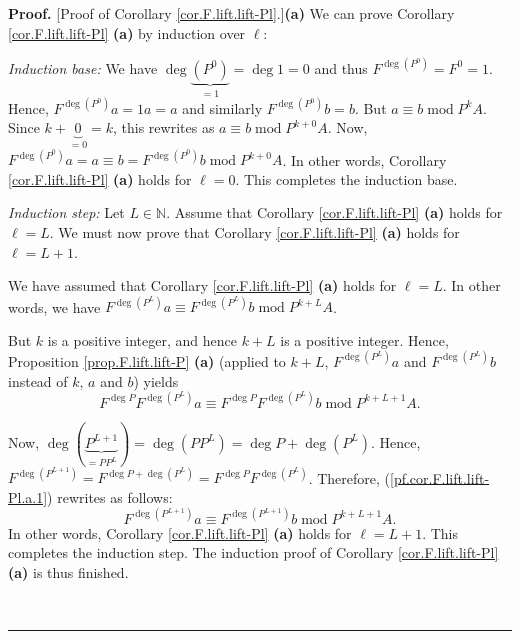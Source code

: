 \documentclass[numbers=enddot,12pt,final,onecolumn,notitlepage]{scrartcl}%
\theoremstyle{definition}
\newenvironment{proof}[1][Proof]{\noindent\textbf{#1.} }{\ \rule{0.5em}{0.5em}}
\begin{document}
\begin{proof}
[Proof of Corollary \ref{cor.F.lift.lift-Pl}.]\textbf{(a)} We can prove
Corollary \ref{cor.F.lift.lift-Pl} \textbf{(a)} by induction over $\ell$:

\textit{Induction base:} We have $\deg\underbrace{\left(  P^{0}\right)  }%
_{=1}=\deg1=0$ and thus $F^{\deg\left(  P^{0}\right)  }=F^{0}=1$. Hence,
$F^{\deg\left(  P^{0}\right)  }a=1a=a$ and similarly $F^{\deg\left(
P^{0}\right)  }b=b$. But $a\equiv b\operatorname{mod}P^{k}A$. Since
$k+\underbrace{0}_{=0}=k$, this rewrites as $a\equiv b\operatorname{mod}%
P^{k+0}A$. Now, $F^{\deg\left(  P^{0}\right)  }a=a\equiv b=F^{\deg\left(
P^{0}\right)  }b\operatorname{mod}P^{k+0}A$. In other words, Corollary
\ref{cor.F.lift.lift-Pl} \textbf{(a)} holds for $\ell=0$. This completes the
induction base.

\textit{Induction step:} Let $L\in\mathbb{N}$. Assume that Corollary
\ref{cor.F.lift.lift-Pl} \textbf{(a)} holds for $\ell=L$. We must now prove
that Corollary \ref{cor.F.lift.lift-Pl} \textbf{(a)} holds for $\ell=L+1$.

We have assumed that Corollary \ref{cor.F.lift.lift-Pl} \textbf{(a)} holds for
$\ell=L$. In other words, we have $F^{\deg\left(  P^{L}\right)  }a\equiv
F^{\deg\left(  P^{L}\right)  }b\operatorname{mod}P^{k+L}A$.

But $k$ is a positive integer, and hence $k+L$ is a positive integer. Hence,
Proposition \ref{prop.F.lift.lift-P} \textbf{(a)} (applied to $k+L$,
$F^{\deg\left(  P^{L}\right)  }a$ and $F^{\deg\left(  P^{L}\right)  }b$
instead of $k$, $a$ and $b$) yields
\begin{equation}
F^{\deg P}F^{\deg\left(  P^{L}\right)  }a\equiv F^{\deg P}F^{\deg\left(
P^{L}\right)  }b\operatorname{mod}P^{k+L+1}A.
\label{pf.cor.F.lift.lift-Pl.a.1}%
\end{equation}


Now, $\deg\left(  \underbrace{P^{L+1}}_{=PP^{L}}\right)  =\deg\left(
PP^{L}\right)  =\deg P+\deg\left(  P^{L}\right)  $. Hence, $F^{\deg\left(
P^{L+1}\right)  }=F^{\deg P+\deg\left(  P^{L}\right)  }=F^{\deg P}%
F^{\deg\left(  P^{L}\right)  }$. Therefore, (\ref{pf.cor.F.lift.lift-Pl.a.1})
rewrites as follows:%
\[
F^{\deg\left(  P^{L+1}\right)  }a\equiv F^{\deg\left(  P^{L+1}\right)
}b\operatorname{mod}P^{k+L+1}A.
\]
In other words, Corollary \ref{cor.F.lift.lift-Pl} \textbf{(a)} holds for
$\ell=L+1$. This completes the induction step. The induction proof of
Corollary \ref{cor.F.lift.lift-Pl} \textbf{(a)} is thus finished.


\end{proof}
\end{document}

